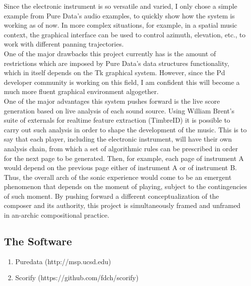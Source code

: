\documentclass{article}
\begin{document}
\noindent Since the electronic instrument is so versatile and varied, I only chose a simple example from Pure Data's audio examples, to quickly show how the system is working as of now. In more complex situations, for example, in a spatial music context, the graphical interface can be used to control azimuth, elevation, etc., to work with different panning trajectories.  \\

\noindent One of the major drawbacks this project currently has is the amount of restrictions which are imposed by Pure Data's data structures functionality, which in itself depends on the Tk graphical system. However, since the Pd developer community is working on this field, I am confident this will become a much more fluent graphical environment algogether. \\

\noindent One of the major advantages this system pushes forward is the live score generation based on live analysis of each sound source. Using William Brent's suite of externals for realtime feature extraction (TimbreID) it is possible to carry out such analysis in order to shape the development of the music. This is to say that each player, including the electronic instrument, will have their own analysis chain, from which a set of algorithmic rules can be prescribed in order for the next page to be generated. Then, for example, each page of instrument A would depend on the previous page either of instrument A or of instrument B. Thus, the overall arch of the sonic experience would come to be an emergent phenomenon that depends on the moment of playing, subject to the contingencies of such moment. By pushing forward a different conceptualization of the composer and its authority, this project is simultaneously framed and unframed in an-archic compositional practice. \\

\subsection{The Software}

\begin{enumerate}

\item Puredata (http://msp.ucsd.edu)

\item Scorify (https://github.com/fdch/scorify)

\end{enumerate}
\end{document}
